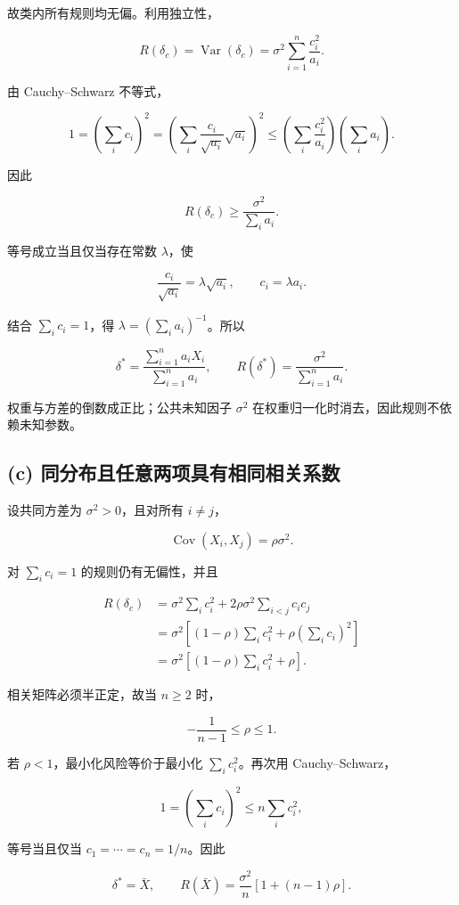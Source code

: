 故类内所有规则均无偏。利用独立性，

\[
R(\delta_c)=\operatorname{Var}(\delta_c)
=\sigma^2\sum_{i=1}^n\frac{c_i^2}{a_i}.
\]

由 Cauchy--Schwarz 不等式，

\[
1=\left(\sum_i c_i\right)^2
=\left(\sum_i\frac{c_i}{\sqrt{a_i}}\sqrt{a_i}\right)^2
\le
\left(\sum_i\frac{c_i^2}{a_i}\right)\left(\sum_i a_i\right).
\]

因此

\[
R(\delta_c)\ge\frac{\sigma^2}{\sum_i a_i}.
\]

等号成立当且仅当存在常数 $\lambda$，使

\[
\frac{c_i}{\sqrt{a_i}}=\lambda\sqrt{a_i},
\qquad c_i=\lambda a_i.
\]

结合 $\sum_i c_i=1$，得 $\lambda=(\sum_i a_i)^{-1}$。所以

\[
\boxed{\delta^*=\frac{\sum_{i=1}^n a_iX_i}{\sum_{i=1}^n a_i}},
\qquad
\boxed{R(\delta^*)=\frac{\sigma^2}{\sum_{i=1}^n a_i}}.
\]

权重与方差的倒数成正比；公共未知因子 $\sigma^2$ 在权重归一化时消去，因此规则不依赖未知参数。

\subsection{(c) 同分布且任意两项具有相同相关系数}

设共同方差为 $\sigma^2>0$，且对所有 $i\ne j$，

\[
\operatorname{Cov}(X_i,X_j)=\rho\sigma^2.
\]

对 $\sum_i c_i=1$ 的规则仍有无偏性，并且

\[
\begin{aligned}
R(\delta_c)
&=\sigma^2\sum_i c_i^2
+2\rho\sigma^2\sum_{i<j}c_ic_j\\
&=\sigma^2\left[
(1-\rho)\sum_i c_i^2+\rho\left(\sum_i c_i\right)^2
\right]\\
&=\sigma^2\left[(1-\rho)\sum_i c_i^2+\rho\right].
\end{aligned}
\]

相关矩阵必须半正定，故当 $n\ge2$ 时，

\[
-\frac1{n-1}\le\rho\le1.
\]

若 $\rho<1$，最小化风险等价于最小化 $\sum_i c_i^2$。再次用 Cauchy--Schwarz，

\[
1=\left(\sum_i c_i\right)^2\le n\sum_i c_i^2,
\]

等号当且仅当 $c_1=\cdots=c_n=1/n$。因此

\[
\boxed{\delta^*=\bar X},
\qquad
\boxed{R(\bar X)=\frac{\sigma^2}{n}[1+(n-1)\rho]}.
\]

